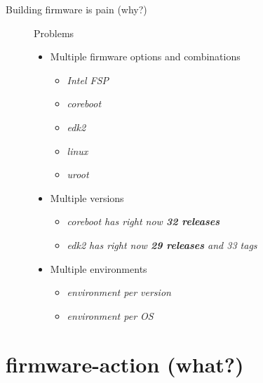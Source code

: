 \documentclass{beamer}
\begin{document}
\begin{frame}{Building firmware is pain (why?)}
	\begin{figure}
	\centering
	\begin{minipage}{.5\textwidth}
		Problems
		\begin{itemize}
		\item{Multiple firmware options and combinations}
			\begin{itemize}
			\item{\textit{Intel FSP}}
			\item{\textit{coreboot}}
			\item{\textit{edk2}}
			\item{\textit{linux}}
			\item{\textit{uroot}}
			\end{itemize}
		\end{itemize}
	\end{minipage}%
	\begin{minipage}{.5\textwidth}
		\begin{itemize}
		\item{Multiple versions}
			\begin{itemize}
			\item{\textit{coreboot has right now \textbf{32 releases}}}
			\item{\textit{edk2 has right now \textbf{29 releases} and 33 tags}}
			\end{itemize}
		\item{Multiple environments}
			\begin{itemize}
			\item{\textit{environment per version}}
			\item{\textit{environment per OS}}
			\end{itemize}
		\end{itemize}
	\end{minipage}
	\end{figure}
\end{frame}




\section{firmware-action (what?)}
\end{document}
